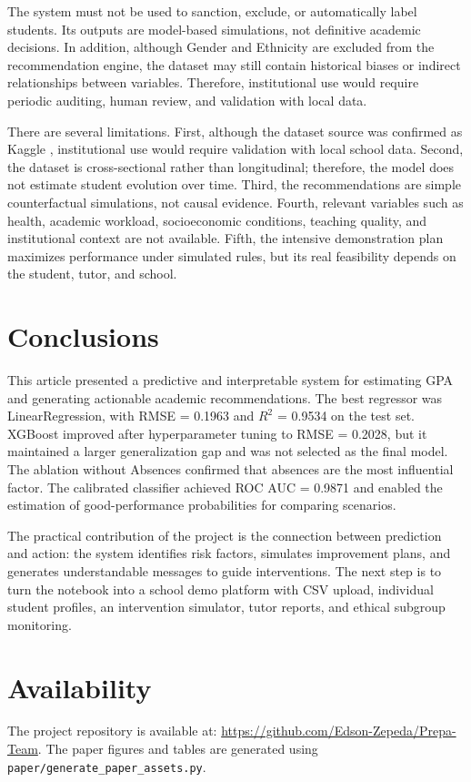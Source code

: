 \documentclass[12pt,onecolumn]{IEEEtran}
\begin{document}
The system must not be used to sanction, exclude, or automatically label students. Its outputs are model-based simulations, not definitive academic decisions. In addition, although Gender and Ethnicity are excluded from the recommendation engine, the dataset may still contain historical biases or indirect relationships between variables. Therefore, institutional use would require periodic auditing, human review, and validation with local data.

There are several limitations. First, although the dataset source was confirmed as Kaggle \cite{kharoua2024students}, institutional use would require validation with local school data. Second, the dataset is cross-sectional rather than longitudinal; therefore, the model does not estimate student evolution over time. Third, the recommendations are simple counterfactual simulations, not causal evidence. Fourth, relevant variables such as health, academic workload, socioeconomic conditions, teaching quality, and institutional context are not available. Fifth, the intensive demonstration plan maximizes performance under simulated rules, but its real feasibility depends on the student, tutor, and school.

\section{Conclusions}

This article presented a predictive and interpretable system for estimating GPA and generating actionable academic recommendations. The best regressor was LinearRegression, with RMSE = 0.1963 and $R^2$ = 0.9534 on the test set. XGBoost improved after hyperparameter tuning to RMSE = 0.2028, but it maintained a larger generalization gap and was not selected as the final model. The ablation without Absences confirmed that absences are the most influential factor. The calibrated classifier achieved ROC AUC = 0.9871 and enabled the estimation of good-performance probabilities for comparing scenarios.

The practical contribution of the project is the connection between prediction and action: the system identifies risk factors, simulates improvement plans, and generates understandable messages to guide interventions. The next step is to turn the notebook into a school demo platform with CSV upload, individual student profiles, an intervention simulator, tutor reports, and ethical subgroup monitoring.

\section*{Availability}

The project repository is available at: \url{https://github.com/Edson-Zepeda/Prepa-Team}. The paper figures and tables are generated using \texttt{paper/generate\_paper\_assets.py}.



\end{document}
